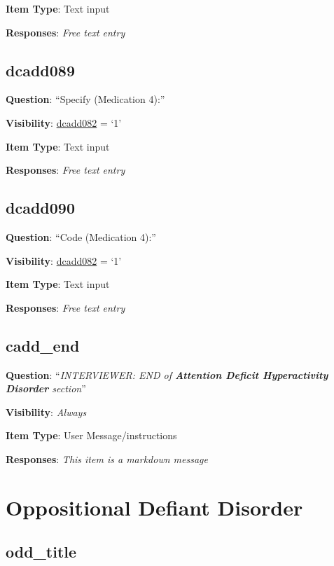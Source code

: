 \documentclass[]{book}
\begin{document}
\textbf{Item Type}: Text input

\textbf{Responses}: \emph{Free text entry}

\hypertarget{dcadd089}{%
\section{dcadd089}\label{dcadd089}}

\textbf{Question}: ``Specify (Medication 4):''

\textbf{Visibility}: \protect\hyperlink{dcadd082}{dcadd082} = `1'

\textbf{Item Type}: Text input

\textbf{Responses}: \emph{Free text entry}

\hypertarget{dcadd090}{%
\section{dcadd090}\label{dcadd090}}

\textbf{Question}: ``Code (Medication 4):''

\textbf{Visibility}: \protect\hyperlink{dcadd082}{dcadd082} = `1'

\textbf{Item Type}: Text input

\textbf{Responses}: \emph{Free text entry}

\hypertarget{cadd_end}{%
\section{cadd\_end}\label{cadd_end}}

\textbf{Question}: ``\emph{INTERVIEWER: END of \textbf{Attention Deficit Hyperactivity Disorder} section}''

\textbf{Visibility}: \emph{Always}

\textbf{Item Type}: User Message/instructions

\textbf{Responses}: \emph{This item is a markdown message}

\hypertarget{odd_section}{%
\chapter{Oppositional Defiant Disorder}\label{odd_section}}

\hypertarget{odd_title}{%
\section{odd\_title}\label{odd_title}}
\end{document}
